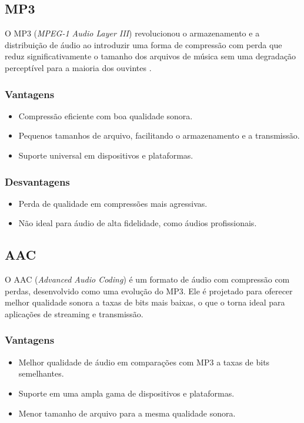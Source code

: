 \documentclass[12pt]{report}
\begin{document}
	\subsection{MP3}
	O MP3 (\textit{MPEG-1 Audio Layer III}) revolucionou o armazenamento e a distribuição de áudio ao introduzir uma forma de compressão com perda que reduz significativamente o tamanho dos arquivos de música sem uma degradação perceptível para a maioria dos ouvintes \cite{aero2024}.

	
	\subsubsection{Vantagens}
	\begin{itemize}
		\item Compressão eficiente com boa qualidade sonora.
		\item Pequenos tamanhos de arquivo, facilitando o armazenamento e a transmissão.
		\item Suporte universal em dispositivos e plataformas.
	\end{itemize}
	
	\subsubsection{Desvantagens}
	\begin{itemize}
		\item Perda de qualidade em compressões mais agressivas.
		\item Não ideal para áudio de alta fidelidade, como áudios profissionais.
	\end{itemize}
	
	\subsection{AAC}
	O AAC (\textit{Advanced Audio Coding}) é um formato de áudio com compressão com perdas, desenvolvido como uma evolução do MP3. Ele é projetado para oferecer melhor qualidade sonora a taxas de bits mais baixas, o que o torna ideal para aplicações de streaming e transmissão.
	
	\subsubsection{Vantagens}
	\begin{itemize}
		\item Melhor qualidade de áudio em comparações com MP3 a taxas de bits semelhantes.
		\item Suporte em uma ampla gama de dispositivos e plataformas.
		\item Menor tamanho de arquivo para a mesma qualidade sonora.
	\end{itemize}
	
\end{document}
